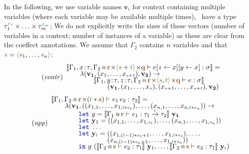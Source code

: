 In the following, we use variable names $\mathbf{v}_i$ for context containing multiple variables (where 
each variable may be available multiple times), \ie~have a type $\tau_1^{\cclrd{r_1}}\times\ldots\times\tau_m^{\cclrd{r_m}}$;
We do not explicitly write the sizes of these vectors (number of variables in a context; number of 
instances of a variable) as these are clear from the coeffect annotations. We assume that $\Gamma_2$ 
contains $n$ variables and that $\aclrd{s}=\alift{\cclrd{s}_1, \ldots, \cclrd{s}_n}$:
%
\begin{equation*}
\hspace{-0.5em}
\tag{\emph{contr}}
\begin{array}{l}
\sem{\coctx{\Gamma_1,x\!:\!\tau,\Gamma_2}{\aclrd{\textbf{r}} \cons \alift{\cclrd{s}+\cclrd{t}} \cons \aclrd{\textbf{q}}} \vdash \subst{\subst{e}{z}{x}}{y}{x} : \sigma} =\\[-0.25em] 
\qquad  \lambda(\mathbf{v_1}, (x_1, \ldots, x_{\cclrd{s}+\cclrd{t}}), \mathbf{v_2}) \rightarrow \\[-0.25em]
\qquad\qquad\sem{\coctx{\Gamma_1,y\!:\!\tau,z\!:\!\tau,\Gamma_2}{\aclrd{\textbf{r}} \cons \alift{\cclrd{s},\cclrd{t}} \cons \aclrd{\textbf{q}}} \vdash e : \sigma}\\[-0.25em]
\qquad\qquad\qquad (\mathbf{v_1}, (x_1, \ldots, x_{\cclrd{s}}), (x_{\cclrd{s}+1}, \ldots, x_{\cclrd{s}+\cclrd{t}} ), \mathbf{v_2})
\end{array}
\end{equation*}
%
\begin{equation*}
\hspace{-0.5em}
\tag{\emph{app}}
\begin{array}{l}
\sem{ \coctx{\Gamma_1, \Gamma_2}{\aclrd{\textbf{r}} \cons (\cclrd{t} \ast \aclrd{\textbf{s}})} \vdash e_1 \, e_2 : \tau_2} = \\[-0.25em]
  \qquad\lambda (\mathbf{v_1}, ((x_{1,1}, \ldots, x_{1,\cclrd{t}\ast\cclrd{s}_1}), \ldots, (x_{n,1}, \ldots, x_{n,\cclrd{t}\ast\cclrd{s}_n}) ) \rightarrow \\[-0.25em]
  \qquad\qquad\kvd{let}~g = \sem{ \coctx{\Gamma_1}{\aclrd{\textbf{r}}} \vdash e_1 : \tau_1 \xrightarrow{\cclrd{t}} \tau_2 }~\mathbf{v_1}\\[-0.25em]
  \qquad\qquad\kvd{let}~\mathbf{y}_1 = ((x_{1,1}, \ldots, x_{1,\cclrd{s}_1}), \ldots, (x_{n,1}, \ldots, x_{1,\cclrd{s}_n})  )\\[-0.25em]
  \qquad\qquad\kvd{let}~\ldots \\[-0.25em]
  \qquad\qquad\kvd{let}~\mathbf{y}_{ \cclrd{t} } = ((x_{1,(\cclrd{t}-1)\ast\cclrd{s}_1 + 1}, \ldots, x_{1,\cclrd{t}\ast\cclrd{s}_1}), \ldots, \\[-0.25em]
  \hspace{8.2em}                                         (x_{n,(\cclrd{t}-1)\ast\cclrd{s}_n + 1}, \ldots, x_{1,\cclrd{t}\ast\cclrd{s}_n})  )\\[-0.25em]
  \qquad\qquad\kvd{in}~g~(\sem{ \coctx{\Gamma_2}{\aclrd{\textbf{s}}} \vdash e_2 : \tau_1}~\mathbf{y}_1, \ldots, 
    \sem{ \coctx{\Gamma_2}{\aclrd{\textbf{s}}} \vdash e_2 : \tau_1}~\mathbf{y}_{\cclrd{t}})
\end{array}
\end{equation*}
